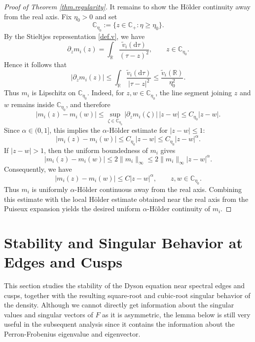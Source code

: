 \documentclass[11pt,twoside, a4paper]{article}
\numberwithin{equation}{section}
\numberwithin{figure}{section}
\theoremstyle{plain} %
\theoremstyle{definition}
\theoremstyle{remark}
\newcommand{\1} {\mspace{1 mu}}
\newcommand{\2} {\mspace{2 mu}}
\newcommand{\C} {{\mathbb{C}}}
\newcommand{\dd}{\mathrm{d}}
\begin{document}
\begin{proof}[Proof of Theorem \ref{thm.regularity}]
It remains to show the Hölder continuity away from the real axis. Fix
\(\eta_0>0\) and set
\[
  \C_{\eta_0}:=\{z\in\mathbb C_+:\eta\ge \eta_0\}.
\]
By the Stieltjes representation \eqref{def.v},
we have
\[
  \partial_z m_i(z)=
  \int_{\mathbb R}\frac{\tilde v_i(\dd \tau)}{(\tau-z)^2},\qquad z\in \C_{\eta_0}.
\]
Hence it follows that
\[
  |\partial_z m_i(z)|
  \le
  \int_{\mathbb R}\frac{\tilde v_i(\dd \tau)}{|\tau-z|^2}
  \le
  \frac{\tilde v_i(\mathbb R)}{\eta_0^2}.
\]
Thus \(m_i\) is Lipschitz on \(\C_{\eta_0}\). Indeed, for
\(z,w\in \C_{\eta_0}\), the line segment joining \(z\) and \(w\) remains
inside \(\C_{\eta_0}\), and therefore
\[
  |m_i(z)-m_i(w)|
  \le
  \sup_{\zeta\in \C_{\eta_0}}|\partial_z m_i(\zeta)|\, |z-w|
  \le
  C_{\eta_0}|z-w|.
\]
Since \(\alpha\in(0,1]\), this implies the \(\alpha\)-Hölder estimate
for \(|z-w|\le 1\):
\[
  |m_i(z)-m_i(w)|
  \le
  C_{\eta_0}|z-w|
  \le
  C_{\eta_0}|z-w|^\alpha .
\]
If \(|z-w|>1\), then the uniform boundedness of \(m_i\) gives
\[
  |m_i(z)-m_i(w)|
  \le
  2\|m_i\|_\infty
  \le
  2\|m_i\|_\infty |z-w|^\alpha .
\]
Consequently, we have
\[
  |m_i(z)-m_i(w)|
  \le
  C |z-w|^\alpha,
  \qquad z,w\in \C_{\eta_0}.
\]
Thus \(m_i\) is uniformly \(\alpha\)-Hölder continuous away from the real
axis. Combining this estimate with the local Hölder estimate obtained
near the real axis from the Puiseux expansion yields the desired uniform
\(\alpha\)-Hölder continuity of \(m_i\).

    
    
    
\end{proof}









\section{Stability and Singular Behavior at Edges and Cusps}
This section studies the stability of the Dyson equation near spectral edges and cusps, together with the resulting square-root and cubic-root singular behavior of the density.
Although we cannot directly get information about the singular values and singular vectors of $F$ as it is asymmetric, the lemma below is still very useful in the subsequent analysis since it contains the information about the Perron-Frobenius eigenvalue and eigenvector.
\end{document}
